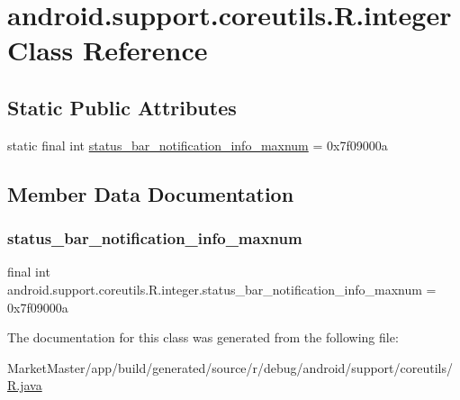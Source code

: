 \hypertarget{classandroid_1_1support_1_1coreutils_1_1R_1_1integer}{}\section{android.\+support.\+coreutils.\+R.\+integer Class Reference}
\label{classandroid_1_1support_1_1coreutils_1_1R_1_1integer}
\subsection*{Static Public Attributes}
\begin{DoxyCompactItemize}
\item 
static final int \mbox{\hyperlink{classandroid_1_1support_1_1coreutils_1_1R_1_1integer_a606a74180704d03d0e19248a38ad09dd}{status\+\_\+bar\+\_\+notification\+\_\+info\+\_\+maxnum}} = 0x7f09000a
\end{DoxyCompactItemize}


\subsection{Member Data Documentation}
\mbox{\label{classandroid_1_1support_1_1coreutils_1_1R_1_1integer_a606a74180704d03d0e19248a38ad09dd}} 
\subsubsection{\texorpdfstring{status\+\_\+bar\+\_\+notification\+\_\+info\+\_\+maxnum}{status\_bar\_notification\_info\_maxnum}}
{\footnotesize\ttfamily final int android.\+support.\+coreutils.\+R.\+integer.\+status\+\_\+bar\+\_\+notification\+\_\+info\+\_\+maxnum = 0x7f09000a\hspace{0.3cm}{\ttfamily [static]}}



The documentation for this class was generated from the following file\+:\begin{DoxyCompactItemize}
\item 
Market\+Master/app/build/generated/source/r/debug/android/support/coreutils/\mbox{\hyperlink{debug_2android_2support_2coreutils_2R_8java}{R.\+java}}\end{DoxyCompactItemize}

